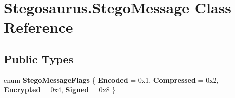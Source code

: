 \hypertarget{class_stegosaurus_1_1_stego_message}{}\section{Stegosaurus.\+Stego\+Message Class Reference}
\label{class_stegosaurus_1_1_stego_message}
\subsection*{Public Types}
\begin{DoxyCompactItemize}
\item 
enum {\bfseries Stego\+Message\+Flags} \{ {\bfseries Encoded} = 0x1, 
{\bfseries Compressed} = 0x2, 
{\bfseries Encrypted} = 0x4, 
{\bfseries Signed} = 0x8
 \}\hypertarget{class_stegosaurus_1_1_stego_message_aae629068f4db90b3298479ee27c7f6a4}{}\label{class_stegosaurus_1_1_stego_message_aae629068f4db90b3298479ee27c7f6a4}

\end{DoxyCompactItemize}
